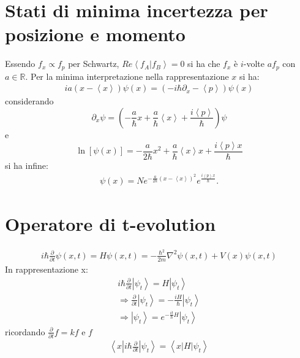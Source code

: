 \section{Stati di minima incertezza per posizione e momento} %
Essendo $f_x\propto f_p$ per Schwartz, $Re\left\langle f_A|f_B \right\rangle=0$ si ha che $f_x$ è $i$-volte $af_p$ con $a\in\mathbb{R} $. Per la minima interpretazione nella rappresentazione $x$ si ha:
\begin{equation}\begin{split}
ia\left(x-\left\langle x \right\rangle\right)\psi \left(x\right)=\left(-i\hbar \partial _x-\left\langle p \right\rangle\right)\psi \left(x\right)
\end{split}\end{equation}
considerando \[\partial _x\psi =\left(-\frac{a}{\hbar }x+\frac{a}{\hbar }\left\langle x \right\rangle+\frac{i\left\langle p \right\rangle}{\hbar }\right)\psi \] e \[\ln{\left[\psi \left(x\right)\right]}=-\frac{a}{2\hbar }x^2+\frac{a}{\hbar }\left\langle x \right\rangle x+\frac{i\left\langle p \right\rangle x}{\hbar }\] si ha infine:
\begin{equation}\begin{split}
\psi \left(x\right)=Ne^{-\frac{a}{2\hbar }\left(x-\left\langle x \right\rangle\right)^2}e^{\frac{i\left\langle p \right\rangle x}{\hbar }}.
\end{split}\end{equation}

\section{Operatore di t-evolution} %
\begin{equation}\begin{split}
i\hbar \frac{\partial }{\partial t}\psi \left(x,t\right)=H\psi \left(x,t\right)=-\frac{\hbar ^2}{2m}\nabla ^2\psi \left(x,t\right)+V\left(x\right)\psi \left(x,t\right)
\end{split}\end{equation}
In rappresentazione x:
\begin{equation}\begin{split}
i\hbar\frac{\partial }{\partial t}\left |\psi _t \right\rangle =H\left |\psi _t \right\rangle \\
\Longrightarrow \frac{\partial }{\partial t}\left |\psi _t \right\rangle=-\frac{iH}{\hbar }\left |\psi _t \right\rangle \\
\Longrightarrow \left |\psi _t \right\rangle=e^{-\frac{it}{\hbar }H}\left |\psi _t \right\rangle
\end{split}\end{equation}
ricordando $\frac{\partial }{\partial t}f=kf$ e $f$
\begin{equation}\begin{split}
\left\langle x|i\hbar \frac{\partial }{\partial t}|\psi _t \right\rangle=\left\langle x|H|\psi _t \right\rangle
\end{split}\end{equation}


